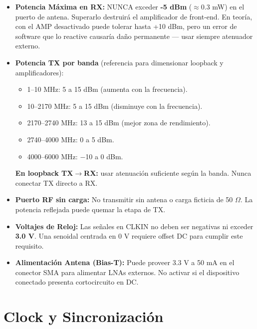 \documentclass[11pt]{article}
\begin{document}
\vspace{4pt}
\begin{itemize}
    \item \textbf{Potencia Máxima en RX:} NUNCA exceder \textbf{-5 dBm} ($\approx$0.3 mW) en el puerto de antena. Superarlo destruirá el amplificador de front-end. En teoría, con el AMP desactivado puede tolerar hasta +10 dBm, pero un error de software que lo reactive causaría daño permanente — usar siempre atenuador externo.
    \item \textbf{Potencia TX por banda} (referencia para dimensionar loopback y amplificadores):
    \begin{itemize}
        \item 1--10 MHz: 5 a 15 dBm (aumenta con la frecuencia).
        \item 10--2170 MHz: 5 a 15 dBm (disminuye con la frecuencia).
        \item 2170--2740 MHz: 13 a 15 dBm (mejor zona de rendimiento).
        \item 2740--4000 MHz: 0 a 5 dBm.
        \item 4000--6000 MHz: $-$10 a 0 dBm.
    \end{itemize}
    \textbf{En loopback TX$\to$RX:} usar atenuación suficiente según la banda. Nunca conectar TX directo a RX.
    \item \textbf{Puerto RF sin carga:} No transmitir sin antena o carga ficticia de 50 $\Omega$. La potencia reflejada puede quemar la etapa de TX.
    \item \textbf{Voltajes de Reloj:} Las señales en CLKIN no deben ser negativas ni exceder \textbf{3.0 V}. Una senoidal centrada en 0 V requiere offset DC para cumplir este requisito.
    \item \textbf{Alimentación Antena (Bias-T):} Puede proveer 3.3 V a 50 mA en el conector SMA para alimentar LNAs externos. No activar si el dispositivo conectado presenta cortocircuito en DC.
\end{itemize}

\section{Clock y Sincronización}
\end{document}
